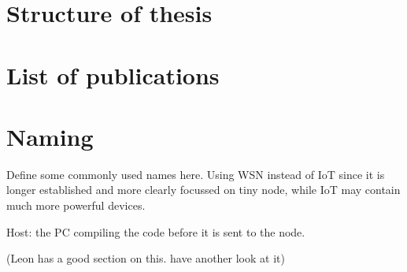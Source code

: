 \section{Structure of thesis}


\section{List of publications}

\section{Naming}

Define some commonly used names here. Using WSN instead of IoT since it is longer established and more clearly focussed on tiny node, while IoT may contain much more powerful devices.

Host: the PC compiling the code before it is sent to the node.

(Leon has a good section on this. have another look at it)